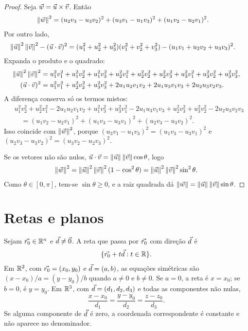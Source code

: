 \documentclass[11pt,a4paper]{article}
\begin{document}
\begin{proof}
Seja $\vec{w}=\vec{u}\times\vec{v}$. Então
\begin{align*}
\left\lVert \vec{w} \right\rVert^2
&=(u_2v_3-u_3v_2)^2+(u_3v_1-u_1v_3)^2+(u_1v_2-u_2v_1)^2.
\end{align*}
Por outro lado,
\begin{align*}
\left\lVert \vec{u} \right\rVert^2\left\lVert \vec{v} \right\rVert^2-(\vec{u}\cdot\vec{v})^2
&=(u_1^2+u_2^2+u_3^2)(v_1^2+v_2^2+v_3^2)-(u_1v_1+u_2v_2+u_3v_3)^2.
\end{align*}
Expanda o produto e o quadrado:
\begin{align*}
\left\lVert \vec{u} \right\rVert^2\left\lVert \vec{v} \right\rVert^2
&=u_1^2v_1^2+u_1^2v_2^2+u_1^2v_3^2
+u_2^2v_1^2+u_2^2v_2^2+u_2^2v_3^2
+u_3^2v_1^2+u_3^2v_2^2+u_3^2v_3^2,\\
(\vec{u}\cdot\vec{v})^2
&=u_1^2v_1^2+u_2^2v_2^2+u_3^2v_3^2
+2u_1u_2v_1v_2+2u_1u_3v_1v_3+2u_2u_3v_2v_3.
\end{align*}
A diferença conserva só os termos mistos:
\begin{align*}
&u_1^2v_2^2+u_2^2v_1^2-2u_1u_2v_1v_2
+u_1^2v_3^2+u_3^2v_1^2-2u_1u_3v_1v_3
+u_2^2v_3^2+u_3^2v_2^2-2u_2u_3v_2v_3\\
&\quad=(u_1v_2-u_2v_1)^2+(u_1v_3-u_3v_1)^2+(u_2v_3-u_3v_2)^2.
\end{align*}
Isso coincide com $\left\lVert \vec{w} \right\rVert^2$, porque $(u_3v_1-u_1v_3)^2=(u_1v_3-u_3v_1)^2$ e $(u_2v_3-u_3v_2)^2=(u_3v_2-u_2v_3)^2$. 

Se os vetores não são nulos, $\vec{u}\cdot\vec{v}=\left\lVert \vec{u} \right\rVert\left\lVert \vec{v} \right\rVert\cos\theta$, logo
\[
\left\lVert \vec{w} \right\rVert^2=\left\lVert \vec{u} \right\rVert^2\left\lVert \vec{v} \right\rVert^2(1-\cos^2\theta)
=\left\lVert \vec{u} \right\rVert^2\left\lVert \vec{v} \right\rVert^2\sin^2\theta.
\]
Como $\theta\in[0,\pi]$, tem-se $\sin\theta\ge 0$, e a raiz quadrada dá $\left\lVert \vec{w} \right\rVert=\left\lVert \vec{u} \right\rVert\left\lVert \vec{v} \right\rVert\sin\theta$.
\end{proof}


\section{Retas e planos}

\begin{definicao}
Sejam $\vec{r_0}\in\mathbb{R}^n$ e $\vec{d}\neq\vec{0}$. A reta que passa por $\vec{r_0}$ com direção $\vec{d}$ é
\[
\{\vec{r_0}+t\vec{d}:t\in\mathbb{R}\}.
\]
Em $\mathbb{R}^2$, com $\vec{r_0}=(x_0,y_0)$ e $\vec{d}=(a,b)$, as equações simétricas são $(x-x_0)/a=(y-y_0)/b$ quando $a\neq 0$ e $b\neq 0$. Se $a=0$, a reta é $x=x_0$; se $b=0$, é $y=y_0$. Em $\mathbb{R}^3$, com $\vec{d}=(d_1,d_2,d_3)$ e todas as componentes não nulas,
\[
\frac{x-x_0}{d_1}=\frac{y-y_0}{d_2}=\frac{z-z_0}{d_3}.
\]
Se alguma componente de $\vec{d}$ é zero, a coordenada correspondente é constante e não aparece no denominador.
\end{definicao}
\end{document}
